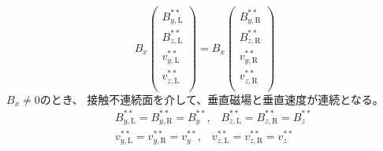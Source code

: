 \begin{equation}
    B_x \left(
    \begin{array}{c}
        B^{**}_{y,\mathrm{L}}\\
        B^{**}_{z,\mathrm{L}}\\
        v^{**}_{y,\mathrm{L}} \\
        v^{**}_{z,\mathrm{L}} \\
    \end{array}
    \right)
    = B_x
    \left(
    \begin{array}{c}
        B^{**}_{y,\mathrm{R}}\\
       B^{**}_{z,\mathrm{R}}\\
       v^{**}_{y,\mathrm{R}} \\
      v^{**}_{z,\mathrm{R}} \\
    \end{array}
    \right)
\end{equation}
$B_x\ne 0$のとき、
接触不連続面を介して、垂直磁場と垂直速度が連続となる。
\begin{eqnarray}
  &&  B^{**}_{y,\mathrm{L}} = B^{**}_{y,\mathrm{R}} = B^{**}_y,\;\;\;
   B^{**}_{z,\mathrm{L}} = B^{**}_{z,\mathrm{R}} = B^{**}_z
  \\
  &&  v^{**}_{y,\mathrm{L}} = v^{**}_{y,\mathrm{R}} = v^{**}_y,\;\;\;
    v^{**}_{z,\mathrm{L}} = v^{**}_{z,\mathrm{R}} = v^{**}_z
\end{eqnarray}

